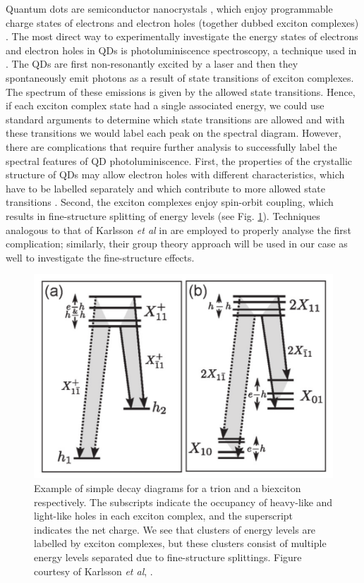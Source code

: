 \documentclass[12pt]{article}
\begin{document}
Quantum dots are semiconductor nanocrystals \cite{other_applications}, which enjoy programmable charge states of electrons and electron holes (together dubbed exciton complexes) \cite{charge_state}. The most direct way to experimentally investigate the energy states of electrons and electron holes in QDs is photoluminiscence spectroscopy, a technique used in \cite{karlsson}. The QDs are first non-resonantly excited by a laser and then they spontaneously emit photons as a result of state transitions of exciton complexes. The spectrum of these emissions is given by the allowed state transitions. Hence, if each exciton complex state had a single associated energy, we could use standard arguments to determine which state transitions are allowed and with these transitions we would label each peak on the spectral diagram. However, there are complications that require further analysis to successfully label the spectral features of QD photoluminiscence. First, the properties of the crystallic structure of QDs may allow electron holes with different characteristics, which have to be labelled separately and which contribute to more allowed state transitions \cite{karlsson2}. Second, the exciton complexes enjoy spin-orbit coupling, which results in fine-structure splitting of energy levels \cite{fine-structure} (see Fig. \ref{fig:decay_diagrams}). Techniques analogous to that of Karlsson \textit{et al} in \cite{karlsson} are employed to properly analyse the first complication; similarly, their group theory approach will be used in our case as well to investigate the fine-structure effects.

\begin{figure}
\begin{center}
\includegraphics[scale=0.3]{figures/example_decay_diagrams}
\end{center}
\caption{Example of simple decay diagrams for a trion and a biexciton respectively. The subscripts indicate the occupancy of heavy-like and light-like holes in each exciton complex, and the superscript indicates the net charge. We see that clusters of energy levels are labelled by exciton complexes, but these clusters consist of multiple energy levels separated due to fine-structure splittings. Figure courtesy of Karlsson \textit{et al}, \cite{karlsson}.}
\label{fig:decay_diagrams}
\end{figure}
	
\end{document}
